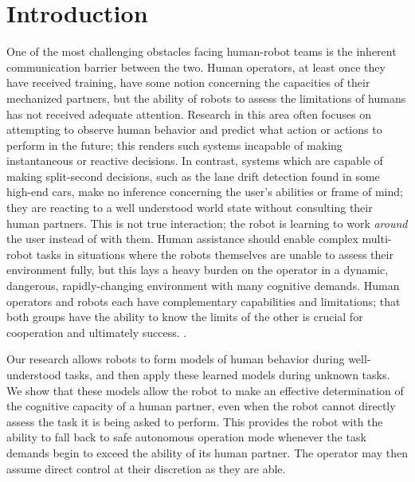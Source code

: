 \documentclass{sig-alternate}
\begin{document}


\section{Introduction}
One of the most challenging obstacles facing human-robot teams is the
inherent communication barrier between the two. Human operators, at
least once they have received training, have some notion concerning
the capacities of their mechanized partners, but the ability of robots
to assess the limitations of humans has not received adequate
attention. Research in this area often focuses on attempting to
observe human behavior and predict what action or actions to perform
in the future; this renders such systems incapable of making
instantaneous or reactive decisions. In contrast, systems which are
capable of making split-second decisions, such as the lane drift
detection found in some high-end cars, make no inference concerning
the user's abilities or frame of mind; they are reacting to a
well understood world state without consulting their human
partners. This is not true interaction; the robot is learning to work
\textit{around} the user instead of with them. Human assistance
should enable complex multi-robot tasks in situations where the robots
themselves are unable to assess their environment fully, but this lays a
heavy burden on the operator in a dynamic, dangerous, rapidly-changing
environment with many cognitive demands. Human
operators and robots each have complementary capabilities and
limitations; that both groups have the ability to know the limits of the other is crucial for cooperation and ultimately success. \cite{Malchus:2013:REC:2447556.2447632}.

Our research allows robots to form models of human behavior during
well-understood tasks, and then apply these learned models during
unknown tasks. We show that these models allow the robot to make an
effective determination of the cognitive capacity of a human partner,
even when the robot cannot directly assess the task it is being asked
to perform. This provides the robot with the ability to fall back to safe
autonomous operation mode whenever the task demands begin to
exceed the ability of its human partner. The operator may then assume direct control at their discretion as they are able.
\end{document}
